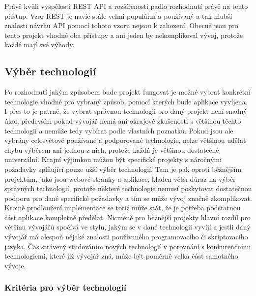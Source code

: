 	Právě kvůli vyspělosti \ac{REST} \ac{API} a rozšířenosti padlo rozhodnutí právě na tento přístup.
	Vzor \ac{REST} je navíc stále velmi populární a používaný a tak hlubší znalosti návrhu \ac{API} pomocí tohoto vzoru
	nejsou k zahození.
	Obecně jsou pro tento projekt vhodné oba přístupy a ani jeden by nekomplikoval vývoj, protože každé mají své výhody.

	\subsection{Výběr technologií}

	Po rozhodnutí jakým způsobem bude projekt fungovat je možné vybrat konkrétní technologie vhodné pro vybraný způsob,
	pomocí kterých bude aplikace vyvíjena.
	I přes to je patrné, že vybrat správnou technologii pro daný projekt není snadný úkol, především pokud vývojář
	nemá ani okrajové zkušenosti s většinou těchto technologií a nemůže tedy vybírat podle vlastních poznatků.
	Pokud jsou ale vybrány celosvětově používané a podporované technologie, nelze většinou udělat chybu výběrem ani
	jednou z nich, protože každá je většinou dostatečně univerzální.
	Krajní výjimkou můžou být specifické projekty s náročnými požadavky splňující pouze užší výběr technologií.
	Tam je pak oproti běžnějším projektům, jako jsou webové stránky a aplikace, kladen větší důraz na výběr správných
	technologií, protože některé technologie nemusí poskytovat dostatečnou podporu pro dané specifické požadavky a tím
	se může vývoj značně zkomplikovat.
	Kromě prodloužení implementace se totiž může stát, že je potřeba podstatnou část aplikace kompletně předělat.
	Nicméně pro běžnější projekty hlavní rozdíl pro většinu vývojářů spočívá ve stylu, jakým se v dané technologii
	vyvíjí a jestli daný vývojář má alespoň nějaké znalosti používaného programovacího či skriptovacího jazyka.
	Čas strávený studováním nových technologií v porovnání s konkurenčními technologiemi, které již vývojář zná, může být
	poměrně velká část samotného vývoje.

		\subsubsection{Kritéria pro výběr technologií}

